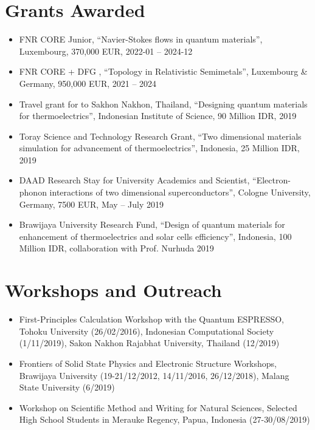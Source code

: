\section*{Grants Awarded}
\begin {itemize}
\item  FNR CORE Junior, ``Navier-Stokes flows in quantum materials'', Luxembourg, 370,000 EUR, 2022-01 -- 2024-12
\item FNR CORE + DFG , ``Topology in Relativistic Semimetals'', Luxembourg \& Germany, 950,000 EUR, 2021 -- 2024
  \item Travel grant for  to Sakhon Nakhon, Thailand, ``Designing quantum materials for thermoelectrics'', Indonesian Institute of Science, 90 Million IDR, 2019
 \item  Toray Science and Technology Research Grant, ``Two dimensional materials simulation for advancement of thermoelectrics'', Indonesia, 25 Million IDR, 2019
 \item  DAAD Research Stay for University Academics and Scientist, ``Electron-phonon interactions of two dimensional superconductors'', Cologne University, Germany, 7500 EUR, May -- July 2019
 \item Brawijaya University Research Fund, ``Design of quantum materials for enhancement of thermoelectrics and solar cells efficiency'', Indonesia, 100 Million IDR, collaboration with Prof. Nurhuda 2019
\end{itemize}


\section*{Workshops and Outreach}
\begin{itemize}

\item   First-Principles Calculation Workshop with the Quantum ESPRESSO,  Tohoku University (26/02/2016), Indonesian Computational Society (1/11/2019), Sakon Nakhon Rajabhat University, Thailand (12/2019) 
\item Frontiers of Solid State Physics and Electronic Structure Workshops, Brawijaya University (19-21/12/2012, 14/11/2016, 26/12/2018), Malang State University (6/2019)
\item Workshop on Scientific Method and Writing for Natural Sciences, Selected High School Students in Merauke Regency, Papua, Indonesia (27-30/08/2019)
\end{itemize}


